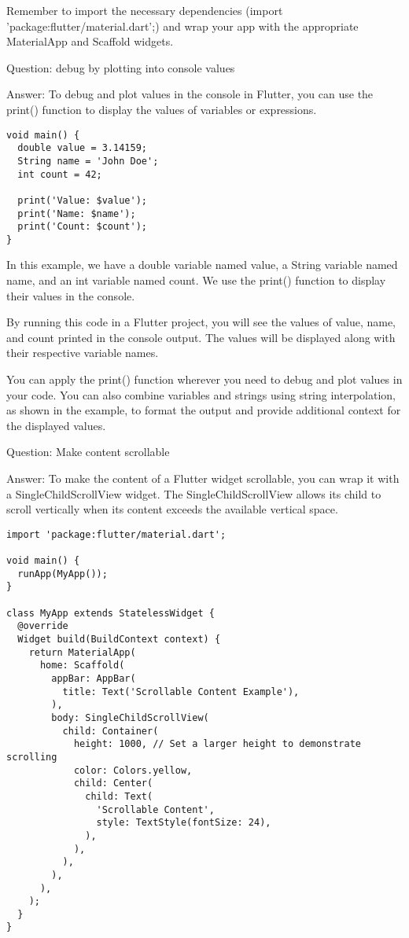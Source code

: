 Remember to import the necessary dependencies (import 'package:flutter/material.dart';) and wrap your app with 
the appropriate MaterialApp and Scaffold widgets.


Question: debug by plotting into console values

Answer: To debug and plot values in the console in Flutter, you can use the print() function to display 
the values of variables or expressions. 

\begin{lstlisting}
void main() {
  double value = 3.14159;
  String name = 'John Doe';
  int count = 42;

  print('Value: $value');
  print('Name: $name');
  print('Count: $count');
}
\end{lstlisting}

In this example, we have a double variable named value, a String variable named name, and an int variable named count. 
We use the print() function to display their values in the console.

By running this code in a Flutter project, you will see the values of value, name, and count printed in the console 
output. The values will be displayed along with their respective variable names.

You can apply the print() function wherever you need to debug and plot values in your code. You can also combine 
variables and strings using string interpolation, as shown in the example, to format the output and provide 
additional context for the displayed values.


Question: Make content scrollable

Answer: To make the content of a Flutter widget scrollable, you can wrap it with a SingleChildScrollView widget. 
The SingleChildScrollView allows its child to scroll vertically when its content exceeds the available vertical space.

\begin{lstlisting}
import 'package:flutter/material.dart';

void main() {
  runApp(MyApp());
}

class MyApp extends StatelessWidget {
  @override
  Widget build(BuildContext context) {
    return MaterialApp(
      home: Scaffold(
        appBar: AppBar(
          title: Text('Scrollable Content Example'),
        ),
        body: SingleChildScrollView(
          child: Container(
            height: 1000, // Set a larger height to demonstrate scrolling
            color: Colors.yellow,
            child: Center(
              child: Text(
                'Scrollable Content',
                style: TextStyle(fontSize: 24),
              ),
            ),
          ),
        ),
      ),
    );
  }
}
\end{lstlisting}

